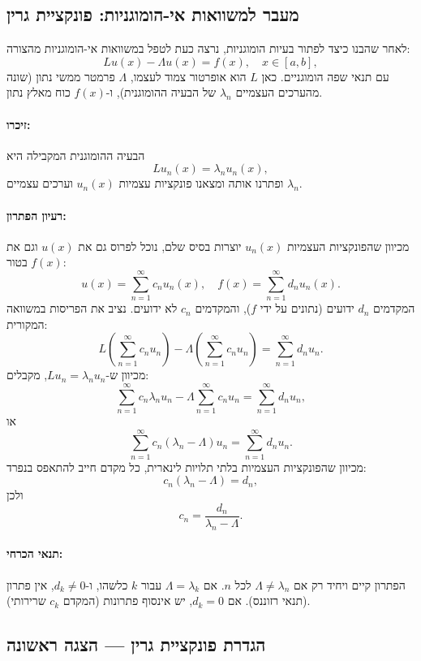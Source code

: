 \subsection*{מעבר למשוואות אי-הומוגניות: פונקציית גרין}

לאחר שהבנו כיצד לפתור בעיות הומוגניות, נרצה כעת לטפל במשוואות אי-הומוגניות מהצורה:
\[
L u(x) - \Lambda u(x) = f(x), \quad x \in [a,b],
\]
עם תנאי שפה הומוגניים. כאן \(L\) הוא אופרטור צמוד לעצמו, \(\Lambda\) פרמטר ממשי נתון (שונה מהערכים העצמיים \(\lambda_n\) של הבעיה ההומוגנית), ו-\(f(x)\) כוח מאלץ נתון.

\paragraph{זיכרו:} הבעיה ההומוגנית המקבילה היא
\[
L u_n(x) = \lambda_n u_n(x),
\]
ופתרנו אותה ומצאנו פונקציות עצמיות \(u_n(x)\) וערכים עצמיים \(\lambda_n\).

\paragraph{רעיון הפתרון:}
מכיוון שהפונקציות העצמיות \(u_n(x)\) יוצרות בסיס שלם, נוכל לפרוס גם את \(u(x)\) וגם את \(f(x)\) בטור:
\[
u(x) = \sum_{n=1}^\infty c_n u_n(x), \quad f(x) = \sum_{n=1}^\infty d_n u_n(x).
\]
המקדמים \(d_n\) ידועים (נתונים על ידי \(f\)), והמקדמים \(c_n\) לא ידועים. נציב את הפריסות במשוואה המקורית:
\[
L \left( \sum_{n=1}^\infty c_n u_n \right) - \Lambda \left( \sum_{n=1}^\infty c_n u_n \right) = \sum_{n=1}^\infty d_n u_n.
\]
מכיוון ש-\(L u_n = \lambda_n u_n\), מקבלים:
\[
\sum_{n=1}^\infty c_n \lambda_n u_n - \Lambda \sum_{n=1}^\infty c_n u_n = \sum_{n=1}^\infty d_n u_n,
\]
או
\[
\sum_{n=1}^\infty c_n (\lambda_n - \Lambda) u_n = \sum_{n=1}^\infty d_n u_n.
\]
מכיוון שהפונקציות העצמיות בלתי תלויות לינארית, כל מקדם חייב להתאפס בנפרד:
\[
c_n (\lambda_n - \Lambda) = d_n,
\]
ולכן
\[
c_n = \frac{d_n}{\lambda_n - \Lambda}.
\]

\paragraph{תנאי הכרחי:}
הפתרון קיים ויחיד רק אם \(\Lambda \neq \lambda_n\) לכל \(n\). אם \(\Lambda = \lambda_k\) עבור \(k\) כלשהו, ו-\(d_k \neq 0\), אין פתרון (תנאי רזוננס). אם \(d_k = 0\), יש אינסוף פתרונות (המקדם \(c_k\) שרירותי).

\subsection*{הגדרת פונקציית גרין — הצגה ראשונה}

